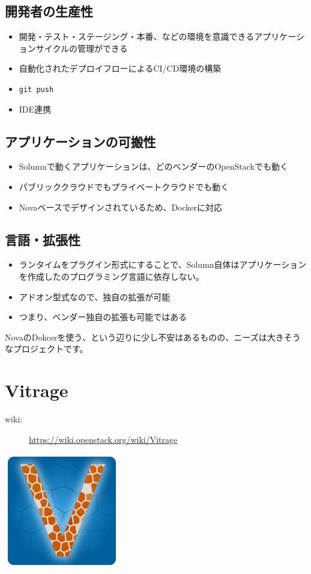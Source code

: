 \documentclass[10pt,b5paper,tombo,openany]{jsbook}
\begin{document}
\subsection*{開発者の生産性}
\begin{itemize}
	\item 開発・テスト・ステージング・本番、などの環境を意識できるアプリケーションサイクルの管理ができる
	\item 自動化されたデプロイフローによるCI/CD環境の構築
	\item \verb|git push|
	\item IDE連携
\end{itemize}

\subsection*{アプリケーションの可搬性}
\begin{itemize}
	\item Solumnで動くアプリケーションは、どのベンダーのOpenStackでも動く
	\item パブリッククラウドでもプライベートクラウドでも動く
	\item Novaベースでデザインされているため、Dockerに対応
\end{itemize}

\subsection*{言語・拡張性}
\begin{itemize}
	\item ランタイムをプラグイン形式にすることで、Solumn自体はアプリケーションを作成したのプログラミング言語に依存しない。
	\item アドオン型式なので、独自の拡張が可能
	\item つまり、ベンダー独自の拡張も可能ではある
\end{itemize}

NovaのDokcerを使う、という辺りに少し不安はあるものの、ニーズは大きそうなプロジェクトです。

\section{Vitrage}
\begin{description}
	\item[wiki:] \url{https://wiki.openstack.org/wiki/Vitrage}
\end{description}

\includegraphics{img/Vitrage_logo_finaly.png}
\end{document}
